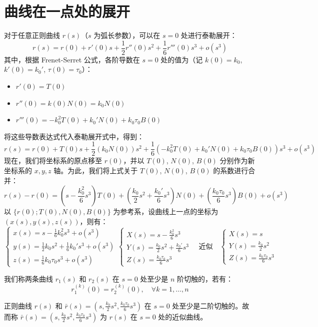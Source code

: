 \documentclass[lang=cn,10pt,thmcnt=section]{elegantbook}
\begin{document}
\section{曲线在一点处的展开}
对于任意正则曲线 \(r(s)\)（\(s\) 为弧长参数），可以在 \(s=0\) 处进行泰勒展开：
\[
r(s) = r(0) + r'(0)s + \frac{1}{2}r''(0)s^2 + \frac{1}{6}r'''(0)s^3 + o(s^3)
\]
其中，根据 Frenet-Serret 公式，各阶导数在 \(s=0\) 处的值为（记 \(k(0)=k_0\), \(k'(0)=k_0'\), \(\tau(0)=\tau_0\)）：
\begin{itemize}
    \item \(r'(0) = T(0)\)
    \item \(r''(0) = k(0)N(0) = k_0 N(0)\)
    \item \(r'''(0) = -k_0^2 T(0) + k_0' N(0) + k_0 \tau_0 B(0)\)
\end{itemize}
将这些导数表达式代入泰勒展开式中，得到：
\[
r(s) = r(0) + T(0)s + \frac{1}{2}\left( k_0 N(0) \right)s^2 + \frac{1}{6}\left( -k_0^2 T(0) + k_0' N(0) + k_0 \tau_0 B(0) \right)s^3 + o(s^3)
\]
现在，我们将坐标系的原点移至 \(r(0)\)，并以 \(T(0)\), \(N(0)\), \(B(0)\) 分别作为新坐标系的 \(x, y, z\) 轴。为此，我们将上式关于 \(T(0)\), \(N(0)\), \(B(0)\) 的系数进行合并：
\[
r(s) - r(0) = \left( s - \frac{k_0^2}{6}s^3 \right)T(0) + \left( \frac{k_0}{2}s^2 + \frac{k_0'}{6}s^3 \right)N(0) + \left( \frac{k_0 \tau_0}{6}s^3 \right)B(0) + o(s^3)
\]
以 \(\{ r(0); T(0), N(0), B(0) \}\) 为参考系，设曲线上一点的坐标为 \((x(s), y(s), z(s))\)，则有：
\[
\begin{cases}
x(s) = s - \frac{1}{6}k_0^2 s^3 + o(s^3) \\
y(s) = \frac{1}{2}k_0 s^2 + \frac{1}{6}k_0' s^3 + o(s^3) \\
z(s) = \frac{1}{6}k_0 \tau_0 s^3 + o(s^3)
\end{cases}
\begin{cases}
X(s) = s - \frac{k_0^2}{6} s^3 \\
Y(s) = \frac{k_0}{2} s^2 + \frac{k_0'}{6} s^3 \\
Z(s) = \frac{k_0 \tau_0}{6} s^3
\end{cases}
\quad \text{近似} \quad
\begin{cases}
X(s) = s \\
Y(s) = \frac{k_0}{2} s^2 \\
Z(s) = \frac{k_0 \tau_0}{6} s^3
\end{cases}
\]


\begin{definition}
    我们称两条曲线 \(r_1(s)\) 和 \(r_2(s)\) 在 \(s=0\) 处至少是 \(n\) 阶切触的，若有：
$$
r_1^{(k)}(0) = r_2^{(k)}(0), \quad \forall k=1,\ldots,n
$$
\end{definition}
\begin{corollary}
    正则曲线 \(r(s)\) 和 \(\bar{r}(s) = \left( s, \frac{k_0}{2} s^2, \frac{k_0 \tau_0}{6} s^3 \right)\) 在 \(s=0\) 处至少是二阶切触的。故而称 \(\bar{r}(s) = \left( s, \frac{k_0}{2} s^2, \frac{k_0 \tau_0}{6} s^3 \right)\) 为 \(r(s)\) 在 \(s=0\) 处的近似曲线。
\end{corollary}
\end{document}
